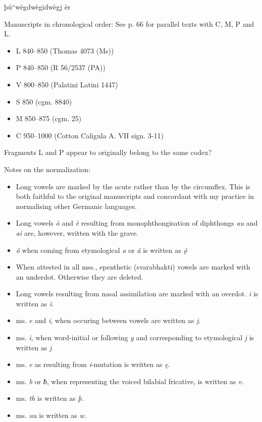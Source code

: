 þú“wègdwègidwègj èr 

Manuscripts in chronological order:
  See p. 66 for parallel texts with C, M, P and L.

\begin{itemize}
  \item L 840–850 (Thomas 4073 (Ms))
  \item P 840–850 (R 56/2537 (PA))
  \item V 800–850 (Palatini Latini 1447)
  \item S 850 (cgm. 8840)
  \item M 850–875 (cgm. 25)
  \item C 950–1000 (Cotton Caligula A. VII sign. 3-11)
\end{itemize}

Fragments L and P appear to originally belong to the same codex?


Notes on the normalization:
  \begin{itemize}
    \item Long vowels are marked by the acute rather than by the circumflex. This is both faithful to the original manuscripts and concordant with my practice in normalising other Germanic languages.
    \item Long vowels \emph{ò} and \emph{è} resulting from monophthongisation of diphthongs \emph{au} and \emph{ai} are, however, written with the grave.
    \item \emph{ó} when coming from etymological \emph{a} or \emph{á} is written as \emph{ǫ́}
    \item When attested in all mss., epenthetic (svarabhakti) vowels are marked with an underdot. Otherwise they are deleted.
    \item Long vowels resulting from nasal assimilation are marked with an overdot. \emph{i} is written as \emph{ï}.
    \item ms. \emph{e} and \emph{i}, when occuring between vowels are written as \emph{j}.
    \item ms. \emph{i}, when word-initial or following \emph{g} and corresponding to etymological \emph{j} is written as \emph{j}
    \item ms. \emph{e} as resulting from \emph{i}-mutation is written as \emph{ę}.
    \item ms. \emph{b} or \emph{ƀ}, when representing the voiced bilabial fricative, is written as \emph{v}.
    \item ms. \emph{th} is written as \emph{þ}.
    \item ms. \emph{uu} is written as \emph{w}.
  \end{itemize}

